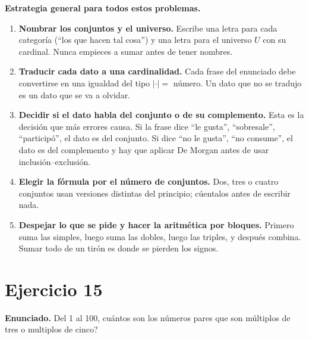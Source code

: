 \documentclass[11pt]{article}
\begin{document}
\begin{tip}
\textbf{Estrategia general para todos estos problemas.}
\begin{enumerate}[leftmargin=*]
  \item \textbf{Nombrar los conjuntos y el universo.} Escribe una letra para cada categor\'ia (``los que hacen tal cosa'') y una letra para el universo $U$ con su cardinal. Nunca empieces a sumar antes de tener nombres.
  \item \textbf{Traducir cada dato a una cardinalidad.} Cada frase del enunciado debe convertirse en una igualdad del tipo $|{\cdot}|=$ n\'umero. Un dato que no se tradujo es un dato que se va a olvidar.
  \item \textbf{Decidir si el dato habla del conjunto o de su complemento.} Esta es la decisi\'on que m\'as errores causa. Si la frase dice ``le gusta'', ``sobresale'', ``particip\'o'', el dato es del conjunto. Si dice ``no le gusta'', ``no consume'', el dato es del complemento y hay que aplicar De Morgan antes de usar inclusi\'on--exclusi\'on.
  \item \textbf{Elegir la f\'ormula por el n\'umero de conjuntos.} Dos, tres o cuatro conjuntos usan versiones distintas del principio; c\'uentalos antes de escribir nada.
  \item \textbf{Despejar lo que se pide y hacer la aritm\'etica por bloques.} Primero suma las simples, luego suma las dobles, luego las triples, y despu\'es combina. Sumar todo de un tir\'on es donde se pierden los signos.
\end{enumerate}
\end{tip}

\newpage

\section*{Ejercicio 15}

\textbf{Enunciado.} Del 1 al 100, cu\'antos son los n\'umeros pares que son m\'ultiplos de tres o multiplos de cinco?
\end{document}
